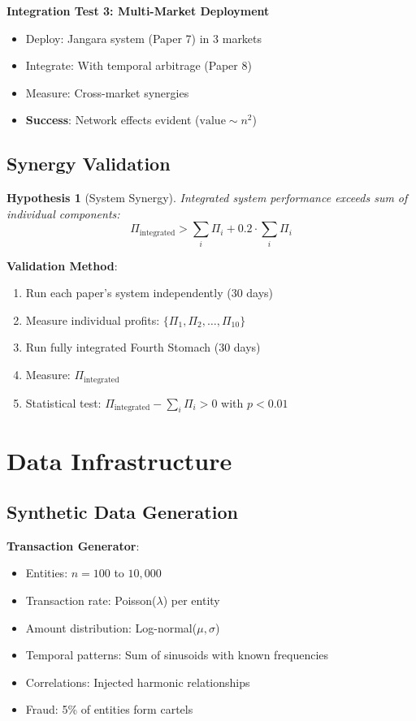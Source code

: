 \documentclass[12pt]{article}
\newtheorem{hypothesis}{Hypothesis}
\begin{document}
\textbf{Integration Test 3: Multi-Market Deployment}
\begin{itemize}
    \item Deploy: Jangara system (Paper 7) in 3 markets
    \item Integrate: With temporal arbitrage (Paper 8)
    \item Measure: Cross-market synergies
    \item \textbf{Success}: Network effects evident ($\text{value} \sim n^2$)
\end{itemize}

\subsection{Synergy Validation}

\begin{hypothesis}[System Synergy]
Integrated system performance exceeds sum of individual components:
$$
\Pi_{\text{integrated}} > \sum_i \Pi_i + 0.2 \cdot \sum_i \Pi_i
$$
\end{hypothesis}

\textbf{Validation Method}:
\begin{enumerate}
    \item Run each paper's system independently (30 days)
    \item Measure individual profits: $\{\Pi_1, \Pi_2, \ldots, \Pi_{10}\}$
    \item Run fully integrated Fourth Stomach (30 days)
    \item Measure: $\Pi_{\text{integrated}}$
    \item Statistical test: $\Pi_{\text{integrated}} - \sum_i \Pi_i > 0$ with $p < 0.01$
\end{enumerate}

\section{Data Infrastructure}

\subsection{Synthetic Data Generation}

\textbf{Transaction Generator}:
\begin{itemize}
    \item Entities: $n = 100$ to $10,000$
    \item Transaction rate: Poisson($\lambda$) per entity
    \item Amount distribution: Log-normal($\mu, \sigma$)
    \item Temporal patterns: Sum of sinusoids with known frequencies
    \item Correlations: Injected harmonic relationships
    \item Fraud: 5\% of entities form cartels
\end{itemize}
\end{document}
